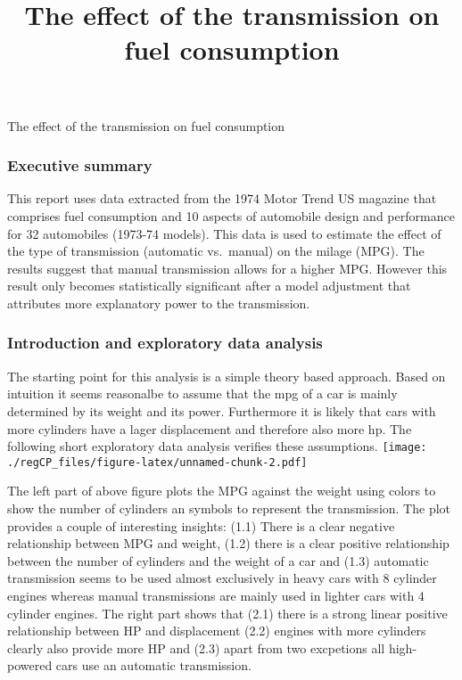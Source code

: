 \documentclass[5pt,]{article}
\title{The effect of the transmission on fuel consumption}
\author{}
\date{}
\begin{document}
\begin{center}
\huge The effect of the transmission on fuel consumption \\[0.2cm]
\normalsize
\end{center}


\subsubsection{Executive summary}\label{executive-summary}

This report uses data extracted from the 1974 Motor Trend US magazine
that comprises fuel consumption and 10 aspects of automobile design and
performance for 32 automobiles (1973-74 models). This data is used to
estimate the effect of the type of transmission (automatic vs.~manual)
on the milage (MPG). The results suggest that manual transmission allows
for a higher MPG. However this result only becomes statistically
significant after a model adjustment that attributes more explanatory
power to the transmission.

\subsubsection{Introduction and exploratory data
analysis}\label{introduction-and-exploratory-data-analysis}

The starting point for this analysis is a simple theory based approach.
Based on intuition it seems reasonalbe to assume that the mpg of a car
is mainly determined by its weight and its power. Furthermore it is
likely that cars with more cylinders have a lager displacement and
therefore also more hp. The following short exploratory data analysis
verifies these assumptions.
\texttt{[image: ./regCP\_files/figure-latex/unnamed-chunk-2.pdf]}

The left part of above figure plots the MPG against the weight using
colors to show the number of cylinders an symbols to represent the
transmission. The plot provides a couple of interesting insights: (1.1)
There is a clear negative relationship between MPG and weight, (1.2)
there is a clear positive relationship between the number of cylinders
and the weight of a car and (1.3) automatic transmission seems to be
used almost exclusively in heavy cars with 8 cylinder engines whereas
manual transmissions are mainly used in lighter cars with 4 cylinder
engines. The right part shows that (2.1) there is a strong linear
positive relationship between HP and displacement (2.2) engines with
more cylinders clearly also provide more HP and (2.3) apart from two
excpetions all high-powered cars use an automatic transmission.
\end{document}
